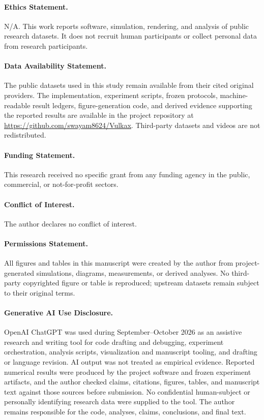 \documentclass[acmtog]{acmart}
\begin{document}
\paragraph{Ethics Statement.}
N/A. This work reports software, simulation, rendering, and analysis of public research datasets. It does not recruit human participants or collect personal data from research participants.

\paragraph{Data Availability Statement.}
The public datasets used in this study remain available from their cited original providers. The implementation, experiment scripts, frozen protocols, machine-readable result ledgers, figure-generation code, and derived evidence supporting the reported results are available in the project repository at \url{https://github.com/swayam8624/Vulkax}. Third-party datasets and videos are not redistributed.

\paragraph{Funding Statement.}
This research received no specific grant from any funding agency in the public, commercial, or not-for-profit sectors.

\paragraph{Conflict of Interest.}
The author declares no conflict of interest.

\paragraph{Permissions Statement.}
All figures and tables in this manuscript were created by the author from project-generated simulations, diagrams, measurements, or derived analyses. No third-party copyrighted figure or table is reproduced; upstream datasets remain subject to their original terms.

\paragraph{Generative AI Use Disclosure.}
OpenAI ChatGPT was used during September--October 2026 as an assistive research and writing tool for code drafting and debugging, experiment orchestration, analysis scripts, visualization and manuscript tooling, and drafting or language revision. AI output was not treated as empirical evidence. Reported numerical results were produced by the project software and frozen experiment artifacts, and the author checked claims, citations, figures, tables, and manuscript text against those sources before submission. No confidential human-subject or personally identifying research data were supplied to the tool. The author remains responsible for the code, analyses, claims, conclusions, and final text.



\end{document}
